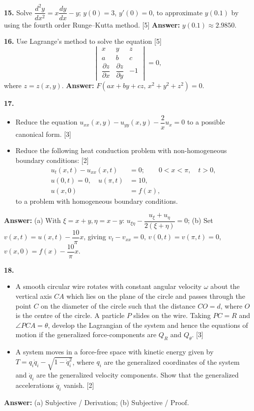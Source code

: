 \documentclass[11pt,a4paper]{article}
\newcommand{\ans}[1]{\textbf{Answer:} #1\par\medskip}
\begin{document}
\textbf{15.} Solve $\dfrac{d^2y}{dx^2} = x\dfrac{dy}{dx} - y$; $y(0) = 3$, $y'(0) = 0$, to approximate $y(0.1)$ by using the fourth order Runge--Kutta method. \hfill [5]
\ans{$y(0.1) \approx 2.9850$.}

\textbf{16.} Use Lagrange's method to solve the equation \hfill [5]
\[
  \begin{vmatrix}
    x & y & z \\
    a & b & c \\
    \dfrac{\partial z}{\partial x} & \dfrac{\partial z}{\partial y} & -1
  \end{vmatrix} = 0,
\]
where $z = z(x,y)$.
\ans{$F(ax + by + cz,\, x^2 + y^2 + z^2) = 0$.}

\textbf{17.}
\begin{itemize}
  \setlength{\itemsep}{3pt}\setlength{\parskip}{0pt}
  \item[(a)] Reduce the equation $u_{xx}(x,y) - u_{yy}(x,y) - \dfrac{2}{x}u_x = 0$ to a possible canonical form. \hfill [3]
  \item[(b)] Reduce the following heat conduction problem with non-homogeneous boundary conditions: \hfill [2]
  \begin{align*}
    u_t(x,t) - u_{xx}(x,t) &= 0; \qquad 0 < x < \pi, \quad t > 0, \\
    u(0,t) = 0, \quad u(\pi,t) &= 10, \\
    u(x,0) &= f(x),
  \end{align*}
  to a problem with homogeneous boundary conditions.
\end{itemize}
\ans{(a) With $\xi = x+y, \eta = x-y$: $u_{\xi\eta} - \dfrac{u_\xi + u_\eta}{2(\xi+\eta)} = 0$; \quad (b) Set $v(x,t) = u(x,t) - \dfrac{10}{\pi}x$, giving $v_t - v_{xx} = 0$, $v(0,t)=v(\pi,t)=0$, $v(x,0)=f(x)-\dfrac{10}{\pi}x$.}

\textbf{18.}
\begin{itemize}
  \setlength{\itemsep}{3pt}\setlength{\parskip}{0pt}
  \item[(a)] A smooth circular wire rotates with constant angular velocity $\omega$ about the vertical axis $CA$ which lies on the plane of the circle and passes through the point $C$ on the diameter of the circle such that the distance $CO = d$, where $O$ is the centre of the circle. A particle $P$ slides on the wire. Taking $PC = R$ and $\angle PCA = \theta$, develop the Lagrangian of the system and hence the equations of motion if the generalized force-components are $Q_R$ and $Q_\theta$. \hfill [3]
  \item[(b)] A system moves in a force-free space with kinetic energy given by $T = q_i \dot{q}_i - \sqrt{1 - \dot{q}_i^2}$, where $q_i$ are the generalized coordinates of the system and $\dot{q}_i$ are the generalized velocity components. Show that the generalized accelerations $\ddot{q}_i$ vanish. \hfill [2]
\end{itemize}
\ans{(a) Subjective / Derivation; \quad (b) Subjective / Proof.}
\end{document}
